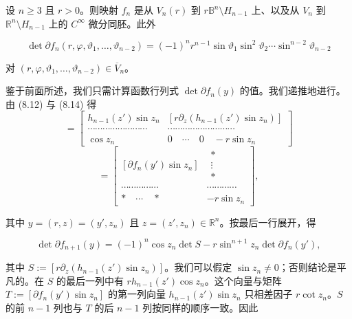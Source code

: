 \begin{lemma}

设 $ n \ge 3 $ 且 $ r > 0 $。则映射 $ f_{n} $ 是从 $ V_{n}(r) $ 到 $ r\mathbb{B}^{n}\setminus H_{n-1} $ 上、以及从 $ V_{n} $ 到 $ \mathbb{R}^{n}\setminus H_{n-1} $ 上的 $ C^{\infty} $ 微分同胚。此外

\[
\det \partial f_{n}(r, \varphi, \vartheta_{1}, \ldots, \vartheta_{n-2}) = (-1)^{n}r^{n-1}\sin\vartheta_{1}\sin^{2}\vartheta_{2}\cdots\sin^{n-2}\vartheta_{n-2}
\]

对 $ (r, \varphi, \vartheta_{1}, \ldots, \vartheta_{n-2}) \in \overline{V}_{n} $。

\proofhead
鉴于前面所述，我们只需计算函数行列式 $ \det \partial f_{n}(y) $ 的值。我们递推地进行。由 (8.12) 与 (8.14) 得
\begin{equation*}
[\partial f_{n+1}(y)] = \begin{bmatrix} h_{n-1}(z')\sin z_{n} & \left[ r\partial_{z}\left( h_{n-1}(z')\sin z_{n} \right) \right] \\ \cdots\cdots\cdots\cdots\cdots\cdots\cdots\cdots & \cdots\cdots\cdots\cdots\cdots\cdots\cdots\cdots\cdots \\ \cos z_{n} & 0 \quad \cdots \quad 0 \quad -r\sin z_{n} \end{bmatrix}
\end{equation*}
\begin{equation*}
= \begin{bmatrix} \left[ \partial f_{n}(y')\sin z_{n} \right] & \begin{matrix} * \\ \vdots \\ * \end{matrix} \\ \cdots\cdots\cdots\cdots\cdots & \cdots\cdots\cdots\cdots \\ * \quad \cdots \quad * & -r\sin z_{n} \end{bmatrix} ,
\end{equation*}

其中 $ y = (r, z) = (y', z_{n}) $ 且 $ z = (z', z_{n}) \in \mathbb{R}^{n} $。按最后一行展开，得

\begin{equation}
\det \partial f_{n+1}(y) = (-1)^{n}\cos z_{n}\det S - r\sin^{n+1}z_{n}\det \partial f_{n}(y'),\tag{8.25}
\end{equation}

其中 $ S := [r\partial_{z}(h_{n-1}(z')\sin z_{n})] $。我们可以假定 $ \sin z_{n} \ne 0 $；否则结论是平凡的。在 $ S $ 的最后一列中有 $ r h_{n-1}(z')\cos z_{n} $。这个向量与矩阵 $ T := [\partial f_{n}(y')\sin z_{n}] $ 的第一列向量 $ h_{n-1}(z')\sin z_{n} $ 只相差因子 $ r\cot z_{n} $。$ S $ 的前 $ n-1 $ 列也与 $ T $ 的后 $ n-1 $ 列按同样的顺序一致。因此


\end{lemma}
